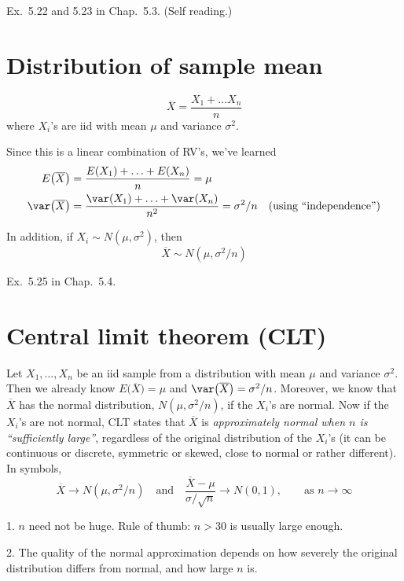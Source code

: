 \documentclass[12pt]{article}
\begin{document}
\example
Ex.~5.22 and 5.23 in Chap.~5.3. (Self reading.)

\section{Distribution of sample mean}

\[
\overline{X} = \frac{X_1 + \dotsc X_n}{n}
\]
where $X_i$'s are iid with mean $\mu$ and variance $\sigma^2$.

Since this is a linear combination of RV's, we've learned
\[\begin{split}
E\bigl(\overline{X}\bigr)
&= \frac{E(X_1) + \dotsc + E(X_n)}{n} = \mu
\\
\var\bigl(\overline{X}\bigr)
&= \frac{\var(X_1) + \dotsc + \var(X_n)}{n^2}
= \sigma^2/n
\quad\text{(using ``independence'')}
\end{split}
\]

In addition, if $X_i \sim N(\mu, \sigma^2)$, then
\[
\overline{X} \sim N(\mu, \sigma^2/n)
\]


\example
Ex.~5.25 in Chap.~5.4.


\section{Central limit theorem (CLT)}

\alert[Theorem]%
Let $X_1,\dotsc,X_n$ be an iid sample from a distribution
with mean $\mu$ and variance $\sigma^2$.
Then we already know
$E\bigl(\overline{X}\bigr) = \mu$ and
$\var\bigl(\overline{X}\bigr) = \sigma^2/n$.
Moreover, we know that $\overline{X}$ has
the normal distribution, $N(\mu, \sigma^2/n)$,
if the $X_i$'s are normal.
Now if the $X_i$'s are not normal,
CLT states that $\overline{X}$ is
\emph{approximately normal when $n$ is ``sufficiently large''},
regardless of the original distribution of the $X_i$'s
(it can be continuous or discrete, symmetric or skewed, close to normal
or rather different).
In symbols,
\[
\overline{X} \longrightarrow N(\mu, \sigma^2/n)
\quad\text{and}\quad
\frac{\overline{X} - \mu}{\sigma/\sqrt{n}} \longrightarrow N(0,1)
,
\qquad\text{as $n\to \infty$}
\]

\alert
1. $n$ need not be huge. Rule of thumb: $n > 30$ is usually large
enough.

2. The quality of the normal approximation
depends on how severely the original distribution differs from normal,
and how large $n$ is.
\end{document}
